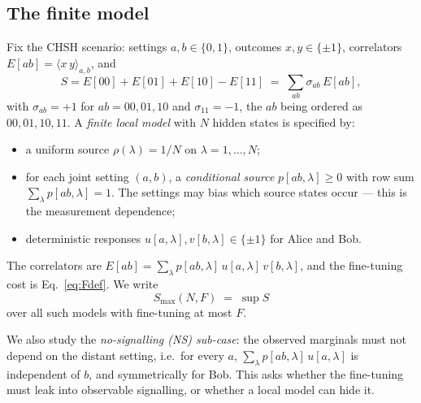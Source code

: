 \documentclass[aps,pra,reprint,superscriptaddress,floatfix]{revtex4-2}
\begin{document}
\subsection{The finite model}
Fix the CHSH scenario: settings $a,b\in\{0,1\}$, outcomes
$x,y\in\{\pm1\}$, correlators
$E[ab]=\langle x\,y\rangle_{a,b}$, and
\begin{equation}
S = E[00]+E[01]+E[10]-E[11] \;=\; \sum_{ab}\sigma_{ab}\,E[ab],
\label{eq:Sdef}
\end{equation}
with $\sigma_{ab}=+1$ for $ab=00,01,10$ and $\sigma_{11}=-1$, the $ab$ being
ordered as $00,01,10,11$. A \emph{finite local model} with
$N$ hidden states is specified by:
\begin{itemize}
\item a uniform source $\rho(\lambda)=1/N$ on $\lambda=1,\dots,N$;
\item for each joint setting $(a,b)$, a \emph{conditional source}
$p[ab,\lambda]\ge 0$ with row sum $\sum_\lambda p[ab,\lambda]=1$. The
settings may bias which source states occur --- this is the
measurement dependence;
\item deterministic responses $u[a,\lambda],v[b,\lambda]\in\{\pm1\}$ for
Alice and Bob.
\end{itemize}
The correlators are
$E[ab]=\sum_\lambda p[ab,\lambda]\,u[a,\lambda]\,v[b,\lambda]$, and the
fine-tuning cost is Eq.~\eqref{eq:Fdef}. We write
\begin{equation}
S_{\max}(N,F) \;=\; \sup S
\end{equation}
over all such models with fine-tuning at most $F$.

We also study the \emph{no-signalling (NS) sub-case}: the observed marginals
must not depend on the distant setting, i.e.\ for every $a$,
$\sum_\lambda p[ab,\lambda]\,u[a,\lambda]$ is independent of $b$, and
symmetrically for Bob. This asks whether the fine-tuning must leak into
observable signalling, or whether a local model can hide it.
\end{document}
